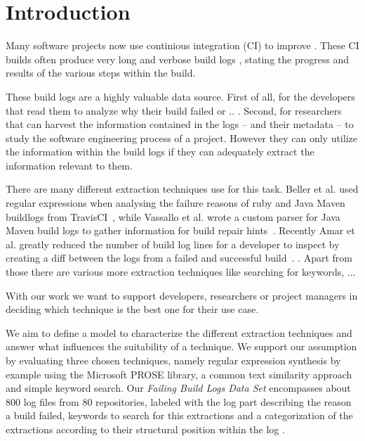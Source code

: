 \documentclass[\myrootdir/main.tex]{subfiles}
\begin{document}
\chapter{Introduction}
Many software projects now use continious integration (CI) to improve . These CI builds often produce very long and verbose build logs , stating the progress and results of the various steps within the build.

These build logs are a highly valuable data source. First of all, for the developers that read them to analyze why their build failed or .. . Second, for researchers that can harvest the information contained in the logs -- and their metadata -- to study the software engineering process of a project. However they can only utilize the information within the build logs if they can adequately extract the information relevant to them.

There are many different extraction techniques use for this task. Beller et al.  used regular expressions when analysing the failure reasons of ruby and Java Maven buildlogs from TravisCI~\cite{beller2017oops}, while Vassallo et al. wrote a custom parser for Java Maven build logs to gather information for build repair hints~\cite{vassallo2018un-break}. Recently Amar et al. greatly reduced the number of build log lines for a developer to inspect by creating a diff between the logs from a failed and successful build~\cite{amar2019mining}. . Apart from those there are various more extraction techniques like searching for keywords, ...  

With our work we want to support developers, researchers or project managers in deciding which technique is the best one for their use case. 


We aim to define a model to characterize the different extraction techniques and answer what influences the suitability of a technique. We support our assumption by evaluating three chosen techniques, namely regular expression synthesis by example using the Microsoft PROSE library, a common text similarity approach and simple keyword search. Our \emph{Failing Build Logs Data Set} encompasses about 800 log files from 80 repositories, labeled with the log part describing the reason a build failed, keywords to search for this extractions and a categorization of the extractions according to their structural position within the log . 
\end{document}
